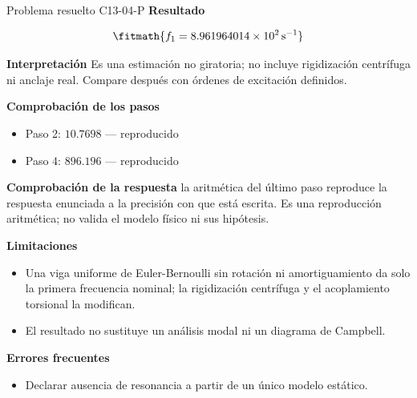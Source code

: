 \documentclass[10pt,openany]{book}
\begin{document}
\begin{studiumworked}{Problema resuelto C13-04-P}
\noindent\textbf{Resultado}

\[
\fitmath{f_1=8.961964014\times10^{2}\,\mathrm{s}^{-1}}
\]

\noindent\textbf{Interpretación}
Es una estimación no giratoria; no incluye rigidización centrífuga ni anclaje real. Compare después con órdenes de excitación definidos.

\noindent\textbf{Comprobación de los pasos}
\begin{itemize}
\item Paso 2: $10.7698$ — reproducido
\item Paso 4: $896.196$ — reproducido
\end{itemize}

\noindent\textbf{Comprobación de la respuesta} la aritmética del último paso reproduce la respuesta enunciada a la precisión con que está escrita. Es una reproducción aritmética; no valida el modelo físico ni sus hipótesis.

\noindent\textbf{Limitaciones}
\begin{itemize}
\item Una viga uniforme de Euler-Bernoulli sin rotación ni amortiguamiento da solo la primera frecuencia nominal; la rigidización centrífuga y el acoplamiento torsional la modifican.
\item El resultado no sustituye un análisis modal ni un diagrama de Campbell.
\end{itemize}

\noindent\textbf{Errores frecuentes}
\begin{itemize}
\item Declarar ausencia de resonancia a partir de un único modelo estático.
\end{itemize}
\end{studiumworked}
\end{document}

